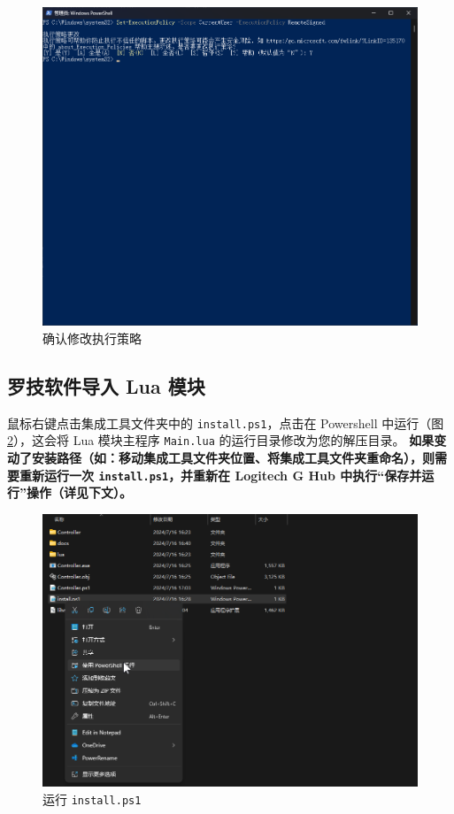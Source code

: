\begin{figure}[H]
    \Centering
    \includegraphics[width=\textwidth]{docs/assets/intro/confirm_execution_policy_01.png}
    \caption{确认修改执行策略}
    \label{ch0fig-confirm-execution-policy}
\end{figure}

\subsection{罗技软件导入 Lua 模块}

鼠标右键点击集成工具文件夹中的 \lstinline{install.ps1}，点击在 Powershell 中运行（图 \ref{ch0fig-run-install-script}），这会将 Lua 模块主程序 \lstinline{Main.lua} 的运行目录修改为您的解压目录。
\textbf{\color{red} 如果变动了安装路径（如：移动集成工具文件夹位置、将集成工具文件夹重命名），则需要重新运行一次 \lstinline{install.ps1}，并重新在 Logitech G Hub 中执行“保存并运行”操作（详见下文）。}

\begin{figure}[H]
    \Centering
    \includegraphics[width=\textwidth]{docs/assets/intro/install.png}
    \caption{运行 \lstinline{install.ps1}}
    \label{ch0fig-run-install-script}
\end{figure}

